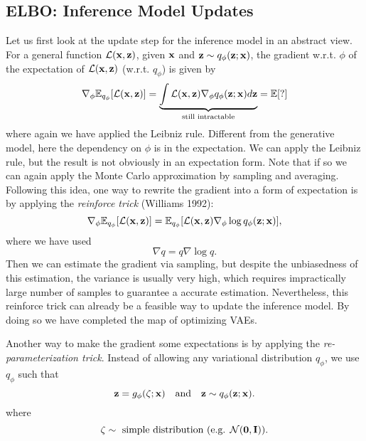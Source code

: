\documentclass[../main.tex]{subfiles}
\begin{document}
\subsection{ELBO: Inference Model Updates}
Let us first look at the update step for the inference model in an abstract view. For a general function $\mathcal{L}({\bf x,z})$, given ${\bf x}$ and ${\bf z}\sim q_\phi({\bf z};{\bf x})$, the gradient w.r.t. $\phi$ of the expectation of $\mathcal{L}({\bf x,z})$ (w.r.t. $q_\phi$) is given by
\begin{equation*}
\nabla_\phi \mathbb{E}_{q_\phi}[\mathcal{L}({\bf x,z})] = \underbrace{\int \mathcal{L}({\bf x,z}) \nabla_\phi q_\phi({\bf z};{\bf x})d{\bf z}}_{\text{still intractable}}=\mathbb{E}[?]
\end{equation*}
where again we have applied the Leibniz rule. Different from the generative model, here the dependency on $\phi$ is in the expectation. We can apply the Leibniz rule, but the result is not obviously in an expectation form. Note that if so we can again apply the Monte Carlo approximation by sampling and averaging. Following this idea, one way to rewrite the gradient into a form of expectation is by applying the \emph{reinforce trick} (Williams 1992):
\begin{equation*}
\nabla_\phi \mathbb{E}_{q_\phi}[\mathcal{L}({\bf x,z})] =  \mathbb{E}_{q_\phi}[\mathcal{L}({\bf x,z})	\nabla_\phi\log q_\phi({\bf z};{\bf x})],
\end{equation*}
where we have used
\begin{equation*}
\nabla q = q\nabla\log q.
\end{equation*}
Then we can estimate the gradient via sampling, but despite the unbiasedness of this estimation, the variance is usually very high, which requires impractically large number of samples to guarantee a accurate estimation. Nevertheless, this reinforce trick can already be a feasible way to update the inference model. By doing so we have completed the map of optimizing VAEs.
\par Another way to make the gradient some expectations is by applying the \emph{re-parameterization trick}. Instead of allowing any variational distribution $q_\phi$, we use $q_\phi$ such that
\begin{equation*}
{\bf z} = g_\phi(\zeta;{\bf x})\quad \text{and}\quad{\bf z}\sim q_\phi({\bf z};{\bf x}).
\end{equation*}
where
\begin{equation*}
\zeta\sim \text{ simple distribution (e.g. }\mathcal{N}({\bf 0,I})).
\end{equation*}
\end{document}
